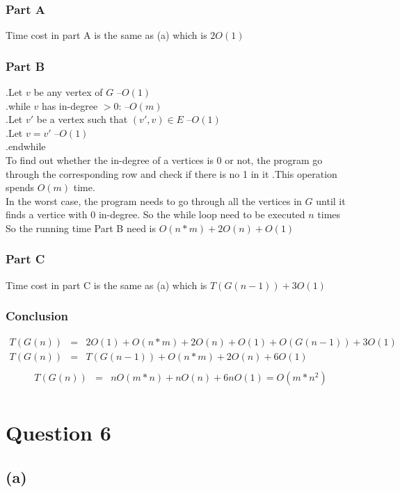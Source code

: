 \documentclass{article} %
\begin{document}
\subsubsection*{Part A}
Time cost in part A is the same as (a) which is $2O(1)$\\
\subsubsection*{Part B}
.\quad Let $v$ be any vertex of $G$ \quad--$O(1)$\\
.\quad while $v$ has in-degree $> 0$: \quad--$O(m)$\\
.\quad\quad Let $v'$ be a vertex such that $(v', v) \in E$ \quad--$O(1)$\\
.\quad\quad Let $v = v'$ \quad--$O(1)$\\
.\quad endwhile\\
To find out whether the in-degree of a vertices is 0 or not, the program go through the corresponding row and check if there is no 1 in it .This operation spends $O(m)$ time.\\
In the worst case, the program needs to go through all the vertices in $G$ until it finds a vertice with 0 in-degree. So the while loop need to be executed $n$ times\\ 
So the running time Part B need is $O(n*m)+2O(n)+O(1)$
\subsubsection*{Part C}
Time cost in part C is the same as (a) which is $T(G(n-1))+3O(1)$\\
\subsubsection*{Conclusion}
\[\begin{array}{rll}
    T(G(n)) &=&2O(1)+O(n*m)+2O(n)+O(1) +O(G(n-1)) +3O(1)\\
    T(G(n)) &=&T(G(n-1)) +O(n*m)+2O(n)+6O(1)\\
\end{array}\]
\[\begin{array}{rll}
    T(G(n)) &=& nO(m*n) + nO(n)+6nO(1) = O(m*n^2)\\
\end{array}\]
\section*{Question 6}
\subsection*{(a)}
\end{document}

